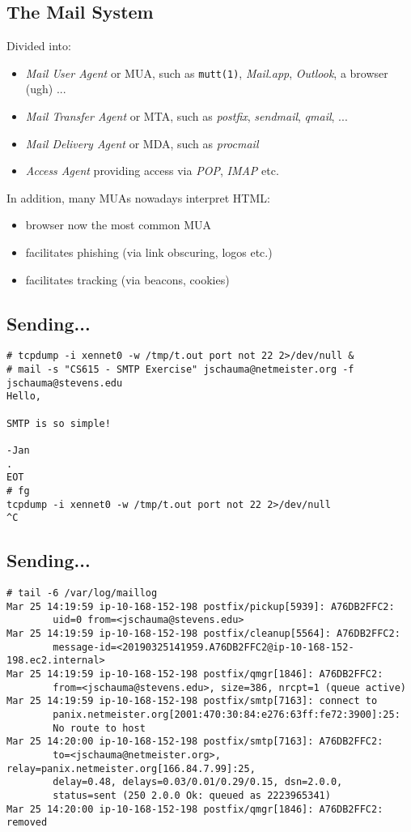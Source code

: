 \documentclass[xga]{xdvislides}
\begin{document}
\subsection{The Mail System}
Divided into:
\begin{itemize}
	\item {\em Mail User Agent} or MUA, such as {\tt mutt(1)}, {\em Mail.app}, {\em Outlook}, a browser (ugh) ...
	\item {\em Mail Transfer Agent} or MTA, such as {\em postfix},
		{\em sendmail}, {\em qmail}, ...
	\item {\em Mail Delivery Agent} or MDA, such as {\em procmail}
	\item {\em Access Agent} providing access via {\em POP}, {\em IMAP} etc.
\end{itemize}
\vspace{.5in}
In addition, many MUAs nowadays interpret HTML:
\begin{itemize}
	\item browser now the most common MUA
	\item facilitates phishing (via link obscuring, logos etc.)
	\item facilitates tracking (via beacons, cookies)
\end{itemize}


\subsection{Sending...}
\begin{verbatim}
# tcpdump -i xennet0 -w /tmp/t.out port not 22 2>/dev/null &
# mail -s "CS615 - SMTP Exercise" jschauma@netmeister.org -f jschauma@stevens.edu
Hello,

SMTP is so simple!

-Jan
.
EOT
# fg
tcpdump -i xennet0 -w /tmp/t.out port not 22 2>/dev/null
^C
\end{verbatim}

\subsection{Sending...}
\begin{verbatim}
# tail -6 /var/log/maillog
Mar 25 14:19:59 ip-10-168-152-198 postfix/pickup[5939]: A76DB2FFC2:
        uid=0 from=<jschauma@stevens.edu>
Mar 25 14:19:59 ip-10-168-152-198 postfix/cleanup[5564]: A76DB2FFC2:
        message-id=<20190325141959.A76DB2FFC2@ip-10-168-152-198.ec2.internal>
Mar 25 14:19:59 ip-10-168-152-198 postfix/qmgr[1846]: A76DB2FFC2:
        from=<jschauma@stevens.edu>, size=386, nrcpt=1 (queue active)
Mar 25 14:19:59 ip-10-168-152-198 postfix/smtp[7163]: connect to
        panix.netmeister.org[2001:470:30:84:e276:63ff:fe72:3900]:25:
        No route to host
Mar 25 14:20:00 ip-10-168-152-198 postfix/smtp[7163]: A76DB2FFC2:
        to=<jschauma@netmeister.org>, relay=panix.netmeister.org[166.84.7.99]:25,
        delay=0.48, delays=0.03/0.01/0.29/0.15, dsn=2.0.0,
        status=sent (250 2.0.0 Ok: queued as 2223965341)
Mar 25 14:20:00 ip-10-168-152-198 postfix/qmgr[1846]: A76DB2FFC2: removed
\end{verbatim}
\end{document}
